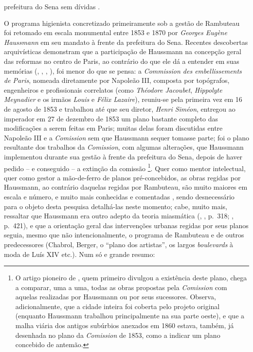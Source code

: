 prefeitura do Sena sem dívidas \cite[p.~399]{rambuteau1905memoires}. 

O programa higienista concretizado primeiramente sob a gestão de Rambuteau foi retomado em escala monumental entre 1853 e 1870 por \textit{Georges Eugène Haussmann} em seu mandato à frente da prefeitura do Sena. Recentes descobertas arquivísticas demonstram que a participação de Haussmann na concepção geral das reformas no centro de Paris, ao contrário do que ele dá a entender em suas memórias (\citeauthor{haussmann1890memoires-1}, \citeyear{haussmann1890memoires-1}, \citeyear{haussmann1890memoires-2}, \citeyear{haussmann1890memoires-3}), foi menor do que se pensa: a \textit{Commission des embellissements de Paris}, nomeada diretamente por Napoleão III, composta por topógrafos, engenheiros e profissionais correlatos (como \textit{Théodore Jacoubet}, \textit{Hippolyte Meynadier} e os irmãos \textit{Louis} e \textit{Félix Lazaire}), reuniu-se pela primeira vez em 16 de agosto de 1853 e trabalhou até que seu diretor, \textit{Henri Siméon}, entregou ao imperador em 27 de dezembro de 1853 um plano bastante completo das modificações a serem feitas em Paris; muitas delas foram discutidas entre Napoleão III e a \textit{Comission} sem que Haussmann sequer tomasse parte; foi o plano resultante dos trabalhos da \textit{Comission}, com algumas alterações, que Haussmann implementou durante sua gestão à frente da prefeitura do Sena, depois de haver pedido -- e conseguido -- a extinção da comissão \cite{bourillon_changer_1999,casselle_embel_1997}\footnote{O artigo pioneiro de , quem primeiro divulgou a existência deste plano, chega a comparar, uma a uma, todas as obras propostas pela \textit{Comission} com aquelas realizadas por Haussmann ou por seus sucessores. Observa, adicionalmente, que a cidade inteira foi coberta pelo projeto original (enquanto Haussmann trabalhou principalmente na sua parte oeste), e que a malha viária dos antigos subúrbios anexados em 1860 estava, também, já desenhada no plano da \textit{Comission} de 1853, como a indicar um plano concebido de antemão.}. Quer como mentor intelectual, quer como gestor a mão-de-ferro de planos pré-concebidos, as obras regidas por Haussmann, ao contrário daquelas regidas por Rambuteau, são muito maiores em escala e número, e muito mais conhecidas e comentadas \cite{bourillon_changer_1999, casselle_embel_1997, dansette_haussmann_1972, faure_paris_2004, hourticq_haussmann_1971, petti_eurfranba_2011, pinkney_ordevpar_1955, pinkney_paris_1957, vossen_villes_1947}, sendo desnecessário para o objeto desta pesquisa detalhá-las neste momento; cabe, muito mais, ressaltar que Haussmann era outro adepto da teoria miasmática (\citeauthor{haussmann1890memoires-2}, \citeyear{haussmann1890memoires-2}, p.~318; \citeyear{haussmann1890memoires-3}, p.~421), e que a orientação geral das intervenções urbanas regidas por seus planos seguia, mesmo que não intencionalmente, o programa de Rambuteau e de outros predecessores (Chabrol, Berger, o ``plano dos artistas'', os largos \textit{boulevards} à moda de Luís XIV etc.). Num só e grande resumo:


